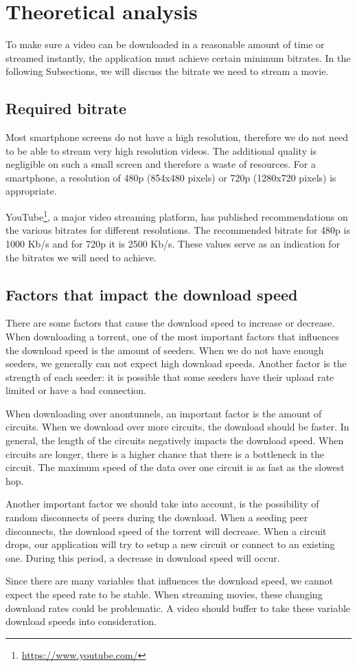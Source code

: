 \section{Theoretical analysis}
\label{sec:experiments:theoretical}
	To make sure a video can be downloaded in a reasonable amount of time or streamed instantly, the application must achieve certain minimum bitrates. In the following Subsections, we will discuss the bitrate we need to stream a movie.
	
	\subsection{Required bitrate}
	\label{sec:experiments:theoretical:bitrates}
		Most smartphone screens do not have a high resolution, therefore we do not need to be able to stream very high resolution videos. The additional quality is negligible on such a small screen and therefore a waste of resources. For a smartphone, a resolution of 480p (854x480 pixels) or 720p (1280x720 pixels) is appropriate.
		
		YouTube\footnote{\url{https://www.youtube.com/}}, a major video streaming platform, has published recommendations on the various bitrates for different resolutions\cite{googlebitrates}. The recommended bitrate for 480p is 1000 Kb/s and for 720p it is 2500 Kb/s. These values serve as an indication for the bitrates we will need to achieve. 
		
	\subsection{Factors that impact the download speed}
		There are some factors that cause the download speed to increase or decrease. When downloading a torrent, one of the most important factors that influences the download speed is the amount of seeders. When we do not have enough seeders, we generally can not expect high download speeds. Another factor is the strength of each seeder: it is possible that some seeders have their upload rate limited or have a bad connection.
		
		When downloading over anontunnels, an important factor is the amount of circuits. When we download over more circuits, the download should be faster. In general, the length of the circuits negatively impacts the download speed. When circuits are longer, there is a higher chance that there is a bottleneck in the circuit. The maximum speed of the data over one circuit is as fast as the slowest hop.
		
		Another important factor we should take into account, is the possibility of random disconnects of peers during the download. When a seeding peer disconnects, the download speed of the torrent will decrease. When a circuit drops, our application will try to setup a new circuit or connect to an existing one. During this period, a decrease in download speed will occur.
		
		Since there are many variables that influences the download speed, we cannot expect the speed rate to be stable. When streaming movies, these changing download rates could be problematic. A video should buffer to take these variable download speeds into consideration.